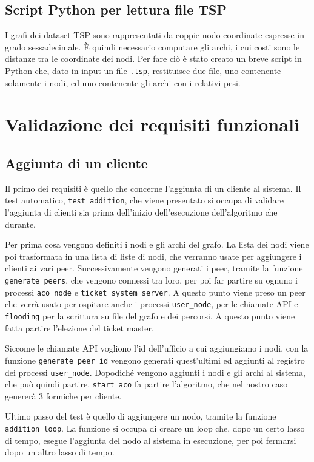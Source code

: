 \subsection{Script Python per lettura file TSP}
I grafi dei dataset TSP sono rappresentati da coppie nodo-coordinate espresse in grado sessadecimale.
È quindi necessario computare gli archi, i cui costi sono le distanze tra le 
coordinate dei nodi. Per fare ciò è stato creato un breve script in Python che,
dato in input un file \texttt{.tsp}, restituisce due file, uno contenente solamente 
i nodi, ed uno contenente gli archi con i relativi pesi.
\section{Validazione dei requisiti funzionali}
\subsection{Aggiunta di un cliente}
Il primo dei requisiti è quello che concerne l'aggiunta di un cliente al sistema.
Il test automatico, \texttt{test\_addition}, che viene presentato si occupa di validare l'aggiunta di clienti
sia prima dell'inizio dell'esecuzione dell'algoritmo che durante.

Per prima cosa vengono definiti i nodi e gli archi del grafo. 
La lista dei nodi viene poi trasformata in una lista di liste di nodi, che verranno usate
per aggiungere i clienti ai vari peer. 
Successivamente vengono generati i peer, tramite la funzione \texttt{generate\_peers},
che vengono connessi tra loro, per poi far partire su ognuno i processi \texttt{aco\_node} e 
\texttt{ticket\_system\_server}. A questo punto viene preso un peer che verrà usato per ospitare
anche i processi \texttt{user\_node}, per le chiamate API e \texttt{flooding} per la scrittura su
file del grafo e dei percorsi. 
A questo punto viene fatta partire l'elezione del ticket master.

Siccome le chiamate API vogliono l'id dell'ufficio a cui aggiungiamo i nodi, con la funzione
\texttt{generate\_peer\_id} vengono generati quest'ultimi ed aggiunti al registro dei processi
\texttt{user\_node}. Dopodiché vengono aggiunti i nodi e gli archi al sistema, che può quindi partire.
\texttt{start\_aco} fa partire l'algoritmo, che nel nostro caso genererà 3 formiche per cliente.

Ultimo passo del test è quello di aggiungere un nodo, tramite la funzione \texttt{addition\_loop}.
La funzione si occupa di creare un loop che, dopo un certo lasso di tempo, esegue l'aggiunta
del nodo al sistema in esecuzione, per poi fermarsi dopo un altro lasso di tempo.

